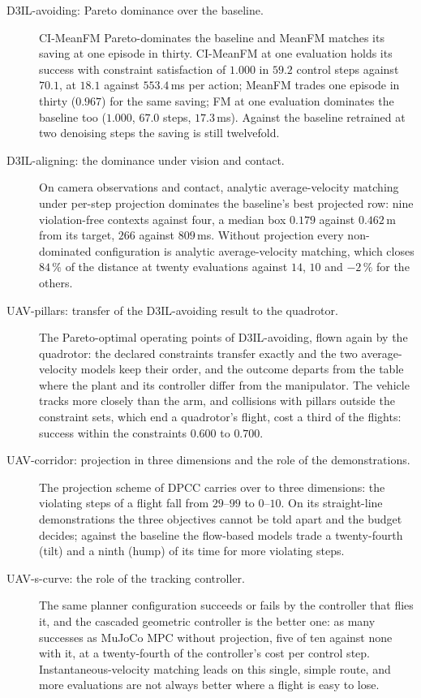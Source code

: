 \begin{description}
  \item[D3IL-avoiding: Pareto dominance over the baseline.] CI-MeanFM Pareto-dominates the baseline and MeanFM
    matches its saving at one episode in thirty. CI-MeanFM at one evaluation holds its success with constraint satisfaction of $1.000$ in $59.2$ control
    steps against $70.1$, at $18.1$ against $553.4$\,ms per action; MeanFM trades one episode in thirty
    ($0.967$) for the same saving; FM at one evaluation dominates the baseline too ($1.000$, $67.0$ steps,
    $17.3$\,ms). Against the baseline retrained at two denoising steps the saving is still twelvefold.
  \item[D3IL-aligning: the dominance under vision and contact.] On camera observations and contact, analytic average-velocity
    matching under per-step projection dominates the baseline's best projected row: nine violation-free
    contexts against four, a median box $0.179$ against $0.462$\,m from its target, $266$ against $809$\,ms.
    Without projection every non-dominated configuration is analytic average-velocity matching, which closes
    $84\,\%$ of the distance at twenty evaluations against $14$, $10$ and $-2\,\%$ for the others.
  \item[UAV-pillars: transfer of the D3IL-avoiding result to the quadrotor.] The Pareto-optimal operating points
    of D3IL-avoiding, flown again by the quadrotor: the declared constraints transfer exactly and the two
    average-velocity models keep their order, and the outcome departs from the table where the plant and its
    controller differ from the manipulator. The vehicle tracks more closely than the arm, and
    collisions with pillars outside the constraint sets, which end a quadrotor's flight, cost a third of the
    flights: success within the constraints $0.600$ to $0.700$.
  \item[UAV-corridor: projection in three dimensions and the role of the demonstrations.] The projection scheme
    of \ac{DPCC} carries over to three dimensions: the violating steps
    of a flight fall from $29$--$99$ to $0$--$10$. On its straight-line demonstrations the three objectives
    cannot be told apart and the budget decides; against the baseline the flow-based models trade a
    twenty-fourth (tilt) and a ninth (hump) of its time for more violating steps.
  \item[UAV-s-curve: the role of the tracking controller.] The same planner configuration succeeds or fails by the controller that
    flies it, and the cascaded geometric controller is the better one: as many successes as MuJoCo MPC without
    projection, five of ten against none with it, at a twenty-fourth of the controller's cost per control step.
    Instantaneous-velocity
    matching leads on this single, simple route, and more evaluations are not always better where a flight
    is easy to lose.
\end{description}

